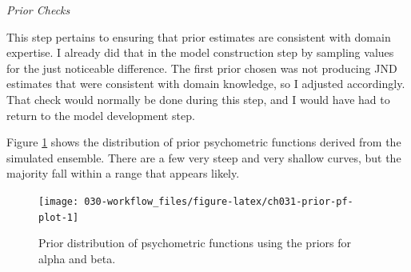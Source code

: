 \documentclass[11pt, oneside, openany]{scrbook}
\newenvironment{Shaded}{\begin{snugshade}}{\end{snugshade}}
\newcommand{\DataTypeTok}[1]{\textcolor[rgb]{0.13,0.29,0.53}{#1}}
\newcommand{\DecValTok}[1]{\textcolor[rgb]{0.00,0.00,0.81}{#1}}
\newcommand{\FloatTok}[1]{\textcolor[rgb]{0.00,0.00,0.81}{#1}}
\newcommand{\KeywordTok}[1]{\textcolor[rgb]{0.13,0.29,0.53}{\textbf{#1}}}
\newcommand{\NormalTok}[1]{#1}
\newcommand{\OperatorTok}[1]{\textcolor[rgb]{0.81,0.36,0.00}{\textbf{#1}}}
\newcommand{\OtherTok}[1]{\textcolor[rgb]{0.56,0.35,0.01}{#1}}
\newcommand{\StringTok}[1]{\textcolor[rgb]{0.31,0.60,0.02}{#1}}
\begin{document}
\begin{Shaded}
\end{Shaded}


\emph{Prior Checks}

This step pertains to ensuring that prior estimates are consistent with domain expertise. I already did that in the model construction step by sampling values for the just noticeable difference. The first prior chosen was not producing JND estimates that were consistent with domain knowledge, so I adjusted accordingly. That check would normally be done during this step, and I would have had to return to the model development step.

Figure \ref{fig:ch031-prior-pf-plot} shows the distribution of prior psychometric functions derived from the simulated ensemble. There are a few very steep and very shallow curves, but the majority fall within a range that appears likely.

\begin{figure}

{\centering \texttt{[image: 030-workflow\_files/figure-latex/ch031-prior-pf-plot-1]} 

}

\caption{Prior distribution of psychometric functions using the priors for alpha and beta.}\label{fig:ch031-prior-pf-plot}
\end{figure}
\end{document}
